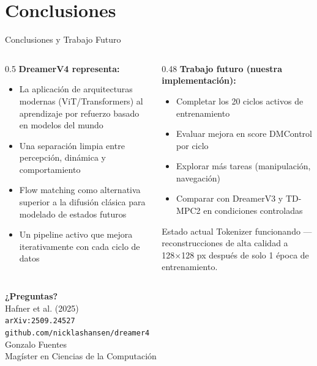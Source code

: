 \documentclass[aspectratio=169, 12pt]{beamer}
\begin{document}
\section{Conclusiones}

\begin{frame}{Conclusiones y Trabajo Futuro}
\begin{columns}[T]
  \begin{column}{0.5\textwidth}
    \textbf{DreamerV4 representa:}
    \begin{itemize}
      \item La aplicación de arquitecturas modernas (ViT/Transformers) al aprendizaje por refuerzo basado en modelos del mundo
      \item Una separación limpia entre percepción, dinámica y comportamiento
      \item Flow matching como alternativa superior a la difusión clásica para modelado de estados futuros
      \item Un pipeline activo que mejora iterativamente con cada ciclo de datos
    \end{itemize}
  \end{column}
  \begin{column}{0.48\textwidth}
    \textbf{Trabajo futuro (nuestra implementación):}
    \begin{itemize}
      \item Completar los 20 ciclos activos de entrenamiento
      \item Evaluar mejora en score DMControl por ciclo
      \item Explorar más tareas (manipulación, navegación)
      \item Comparar con DreamerV3 y TD-MPC2 en condiciones controladas
    \end{itemize}

    \vspace{8pt}
    \begin{alertblock}{Estado actual}
      Tokenizer funcionando — reconstrucciones de alta calidad a 128×128 px después de solo 1 época de entrenamiento.
    \end{alertblock}
  \end{column}
\end{columns}
\end{frame}

\begin{frame}[plain]
  \centering
  \vspace{2cm}
  {\Huge \textbf{¿Preguntas?}}\\[1.5cm]
  {\large Hafner et al. (2025)}\\[0.3cm]
  {\normalsize \texttt{arXiv:2509.24527}}\\[0.3cm]
  {\normalsize \texttt{github.com/nicklashansen/dreamer4}}\\[1.5cm]
  {\large Gonzalo Fuentes\\Magíster en Ciencias de la Computación}
\end{frame}
\end{document}
